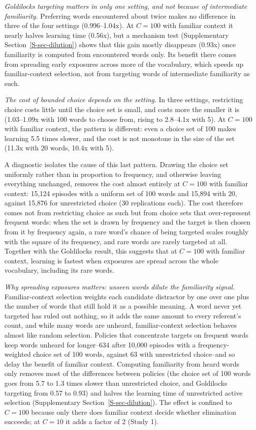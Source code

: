 \documentclass[a4paper,natbib,man]{apa6}
\begin{document}
\textit{Goldilocks targeting matters in only one setting, and not because of intermediate familiarity.} Preferring words encountered about twice makes no difference in three of the four settings (0.996--1.04x). At $C=100$ with familiar context it nearly halves learning time (0.56x), but a mechanism test (Supplementary Section~\ref{S-sec-dilution}) shows that this gain mostly disappears (0.93x) once familiarity is computed from encountered words only. Its benefit there comes from spreading early exposures across more of the vocabulary, which speeds up familiar-context selection, not from targeting words of intermediate familiarity as such.

\textit{The cost of bounded choice depends on the setting.} In three settings, restricting choice costs little until the choice set is small, and costs more the smaller it is (1.03--1.09x with 100 words to choose from, rising to 2.8--4.1x with 5). At $C=100$ with familiar context, the pattern is different: even a choice set of 100 makes learning 5.5 times slower, and the cost is not monotone in the size of the set (11.3x with 20 words, 10.4x with 5).

A diagnostic isolates the cause of this last pattern. Drawing the choice set uniformly rather than in proportion to frequency, and otherwise leaving everything unchanged, removes the cost almost entirely at $C=100$ with familiar context: 15,124 episodes with a uniform set of 100 words and 15,894 with 20, against 15,876 for unrestricted choice (30 replications each). The cost therefore comes not from restricting choice as such but from choice sets that over-represent frequent words: when the set is drawn by frequency and the target is then chosen from it by frequency again, a rare word's chance of being targeted scales roughly with the square of its frequency, and rare words are rarely targeted at all. Together with the Goldilocks result, this suggests that at $C=100$ with familiar context, learning is fastest when exposures are spread across the whole vocabulary, including its rare words.

\textit{Why spreading exposures matters: unseen words dilute the familiarity signal.} Familiar-context selection weights each candidate distractor by one over one plus the number of words that still hold it as a possible meaning. A word never yet targeted has ruled out nothing, so it adds the same amount to every referent's count, and while many words are unheard, familiar-context selection behaves almost like random selection. Policies that concentrate targets on frequent words keep words unheard for longer--634 after 10,000 episodes with a frequency-weighted choice set of 100 words, against 63 with unrestricted choice--and so delay the benefit of familiar context. Computing familiarity from heard words only removes most of the differences between policies (the choice set of 100 words goes from 5.7 to 1.3 times slower than unrestricted choice, and Goldilocks targeting from 0.57 to 0.93) and halves the learning time of unrestricted active selection (Supplementary Section~\ref{S-sec-dilution}). The effect is confined to $C=100$ because only there does familiar context decide whether elimination succeeds; at $C=10$ it adds a factor of 2 (Study 1).
\end{document}
